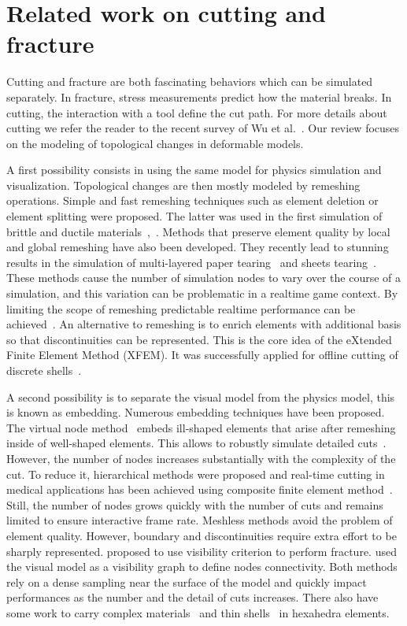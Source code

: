 \section{Related work on cutting and fracture}
\label{sec:starCutting}

Cutting and fracture are both fascinating behaviors which can be simulated separately. 
In fracture, stress measurements predict how the material breaks. 
In cutting, the interaction with a tool define the cut path. 
For more details about cutting we refer the reader to the recent survey of Wu et al.~\cite{Wu2015}. 
Our review focuses on the modeling of topological changes in deformable models.

A first possibility consists in using the same model for physics simulation and visualization. Topological changes are then mostly modeled by remeshing operations. Simple and fast remeshing techniques such as element deletion or element splitting were proposed. The latter was used in the first simulation of brittle and ductile materials~\cite{OBrien1999},~\cite{OBrien2002}. 
 Methods that preserve element quality by local and global remeshing have also been developed. They recently lead to stunning results in the simulation of multi-layered paper tearing~\cite{Busaryev2013} and sheets tearing~\cite{Pfaff2014}. 
These methods cause the number of simulation nodes to vary over the course of a simulation, and this variation can be problematic in a realtime game context.  By limiting the
scope of remeshing predictable realtime performance can be achieved~\cite{Parker2009}.
An alternative to remeshing is to enrich elements with additional basis so that discontinuities can be represented. This is the core idea of the eXtended Finite Element Method (XFEM). It was successfully applied for offline cutting of discrete shells~\cite{Kaufmann2009}.

A second possibility is to separate the visual model from the physics model, this is known as embedding. Numerous embedding techniques have been proposed. The virtual node method~\cite{Molino2004} embeds ill-shaped elements that arise after remeshing inside of well-shaped elements. This allows to robustly simulate detailed cuts~\cite{Wang2014}. However, the number of nodes increases substantially with the complexity of the cut. To reduce it, hierarchical methods were proposed and real-time cutting in medical applications has been achieved using composite finite element method~\cite{Wu2011}. Still, the number of nodes grows quickly with the number of cuts and remains limited to ensure interactive frame rate. Meshless methods avoid the problem of element quality. However, boundary and discontinuities require extra effort to be sharply represented. \cite{Pauly2005} proposed to use visibility criterion to perform fracture. \cite{Steinemann2009} used the visual model as a visibility graph to define nodes connectivity. Both methods rely on a dense sampling near the surface of the model and quickly impact performances as the number  and the detail of cuts increases. There also have some work to carry complex materials~\cite{Nesme2009} and thin shells~\cite{Remillard2013} in hexahedra elements.

